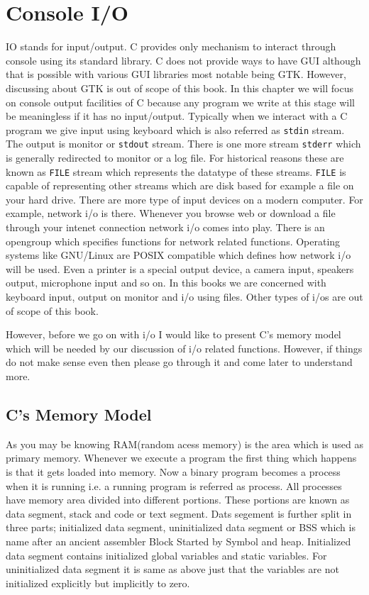 \chapter{Console I/O}
IO stands for input/output. C provides only mechanism to interact through
console using its standard library. C does not provide ways to have GUI
although that is possible with various GUI libraries most notable being
GTK. However, discussing about GTK is out of scope of this book. In this
chapter we will focus on console output facilities of C because any program we
write at this stage will be meaningless if it has no input/output. Typically
when we interact with a C program we give input using keyboard which is also
referred as \texttt{stdin} stream. The output is monitor or \texttt{stdout}
stream. There is one more stream \texttt{stderr} which is generally redirected
to monitor or a log file. For historical reasons these are known as
\texttt{FILE} stream which represents the datatype of these
streams. \texttt{FILE} is capable of representing other streams which are disk
based for example a file on your hard drive. There are more type of input
devices on a modern computer. For example, network i/o is there. Whenever you
browse web or download a file through your intenet connection network i/o comes
into play. There is an opengroup
which specifies functions for network related functions. Operating systems
like GNU/Linux are POSIX compatible which defines how network i/o will be
used. Even a printer is a special output device, a camera input, speakers
output, microphone input and so on. In this books we are concerned with
keyboard input, output on monitor and i/o using files. Other types of i/os are
out of scope of this book.

However, before we go on with i/o I would
like to present C's memory model which will be needed by our discussion of i/o
related functions. However, if things do not make sense even then please go
through it and come later to understand more. 

\section{C's Memory Model}
As you may be knowing RAM(random acess memory) is the area which is used as
primary memory. Whenever we execute a program the first thing which happens is
that it gets loaded into memory. Now a binary program becomes a process when it
is running i.e. a running program is referred as process. All processes have
memory area divided into different portions. These portions are known as data
segment, stack and code or text segment. Dats segement is further split in
three parts; initialized data segment, uninitialized data segment or BSS which
is name after an ancient assembler Block Started by Symbol and
heap. Initialized data segment contains initialized global variables and static
variables. For uninitialized data segment it is same as above just that the
variables are not initialized explicitly but implicitly to zero.

